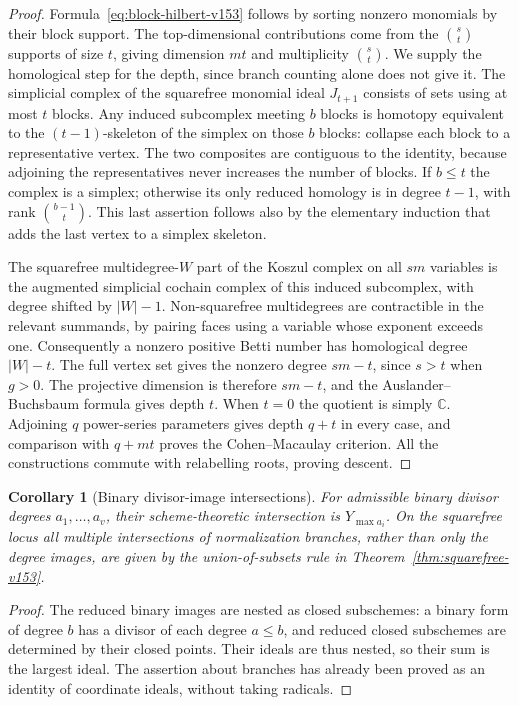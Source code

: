 \documentclass[11pt,reqno]{amsart}
\numberwithin{equation}{section}
\newtheorem{corollary}[theorem]{Corollary}
\theoremstyle{definition}\newtheorem{definition}[theorem]{Definition}
\theoremstyle{remark}\newtheorem{remark}[theorem]{Remark}
\newcommand{\C}{\mathbb C}\newcommand{\Q}{\mathbb Q}
\begin{document}
\begin{proof}
Formula~\eqref{eq:block-hilbert-v153} follows by sorting nonzero
monomials by their block support. The top-dimensional contributions
come from the $\binom{s}{t}$ supports of size $t$, giving dimension
$mt$ and multiplicity $\binom{s}{t}$. We supply the homological step
for the depth, since branch counting alone does not give it. The
simplicial complex of the squarefree monomial ideal $J_{t+1}$ consists
of sets using at most $t$ blocks. Any induced subcomplex meeting $b$
blocks is homotopy equivalent to the $(t-1)$-skeleton of the simplex
on those $b$ blocks: collapse each block to a representative vertex.
The two composites are contiguous to the identity, because adjoining
the representatives never increases the number of blocks. If $b\leq t$
the complex is a simplex; otherwise its only reduced homology is in
degree $t-1$, with rank $\binom{b-1}{t}$. This last assertion follows
also by the elementary induction that adds the last vertex to a
simplex skeleton.

The squarefree multidegree-$W$ part of the Koszul complex on all $sm$
variables is the augmented simplicial cochain complex of this induced
subcomplex, with degree shifted by $|W|-1$. Non-squarefree multidegrees
are contractible in the relevant summands, by pairing faces using a
variable whose exponent exceeds one. Consequently a nonzero positive
Betti number has homological degree $|W|-t$. The full vertex set gives
the nonzero degree $sm-t$, since $s>t$ when $g>0$. The projective
dimension is therefore $sm-t$, and the Auslander--Buchsbaum formula
gives depth $t$. When $t=0$ the quotient is simply $\C$. Adjoining
$q$ power-series parameters gives depth $q+t$ in every case, and
comparison with $q+mt$ proves the Cohen--Macaulay criterion.
All the constructions commute with relabelling roots, proving descent.
\end{proof}

\begin{corollary}[Binary divisor-image intersections]
\label{cor:binary-intersections-v153}
For admissible binary divisor degrees $a_1,\ldots,a_v$, their
scheme-theoretic intersection is $Y_{\max a_i}$. On the squarefree
locus all multiple intersections of normalization branches, rather
than only the degree images, are given by the union-of-subsets rule
in Theorem~\ref{thm:squarefree-v153}.
\end{corollary}
\begin{proof}
The reduced binary images are nested as closed subschemes: a binary
form of degree $b$ has a divisor of each degree $a\leq b$, and
reduced closed subschemes are determined by their closed points.
Their ideals are thus nested, so their sum is the largest ideal.
The assertion about branches has already been proved as an identity
of coordinate ideals, without taking radicals.
\end{proof}
\end{document}
